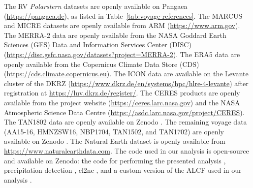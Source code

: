 \documentclass[draft]{agujournal2019}
\begin{document}
The RV \emph{Polarstern} datasets are openly available on Pangaea (\url{https://pangaea.de}), as listed in Table~\ref{tab:voyage-references}. The MARCUS and MICRE datasets are openly available from ARM (\url{https://www.arm.gov}). The MERRA-2 data are openly available from the NASA Goddard Earth Sciences (GES) Data and Information Services Center (DISC) (\url{https://disc.gsfc.nasa.gov/datasets?project=MERRA-2}). The ERA5 data are openly available from the Copernicus Climate Data Store (CDS) (\url{https://cds.climate.copernicus.eu}). The ICON data are available on the Levante cluster of the DKRZ (\url{https://www.dkrz.de/en/systems/hpc/hlre-4-levante}) after registration at \url{https://luv.dkrz.de/register/}. The CERES products are openly available from the project website (\url{https://ceres.larc.nasa.gov}) and the NASA Atmospheric Science Data Centre (\url{https://asdc.larc.nasa.gov/project/CERES}). The TAN1802 data are openly available on Zenodo \cite{kremser2020}. The remaining voyage data (AA15-16, HMNZSW16, NBP1704, TAN1502, and TAN1702) are openly available on Zenodo \cite{mcdonald2024b}. The Natural Earth dataset is openly available from \url{https://www.naturalearthdata.com}. The code used in our analysis is open-source and available on Zenodo: the code for performing the presented analysis \cite{kuma2024a}, precipitation detection \cite{kuma2024b}, cl2nc \cite{kuma2024c}, and a custom version of the ALCF used in our analysis \cite{kuma2024d}.

\acknowledgments
\end{document}
